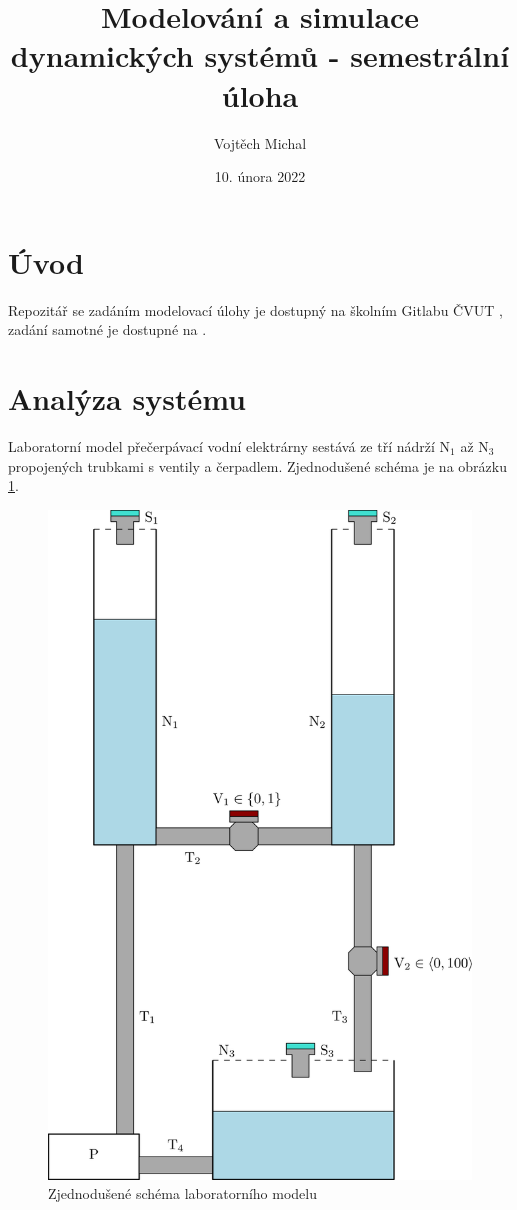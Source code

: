 \documentclass[twoside]{article}
\title{Modelování a simulace dynamických systémů - semestrální úloha}
\author{Vojtěch Michal}
\date{10. února 2022}
\begin{document}
\maketitle

\section{Úvod}

Repozitář se zadáním modelovací úlohy je dostupný na školním Gitlabu ČVUT \cite{repository}, zadání samotné je dostupné na \cite{zadani}.

\section{Analýza systému}

Laboratorní model přečerpávací vodní elektrárny sestává ze tří nádrží $\text{N}_1$ až $\text{N}_3$ propojených trubkami
s ventily a čerpadlem. Zjednodušené schéma je na obrázku \ref{fig:schema}.

\begin{figure}[htbp]
    \centering
    \includegraphics[width=\linewidth]{vodarna_schema.eps}
    \caption{Zjednodušené schéma laboratorního modelu}
    \label{fig:schema}
\end{figure}
\end{document}
